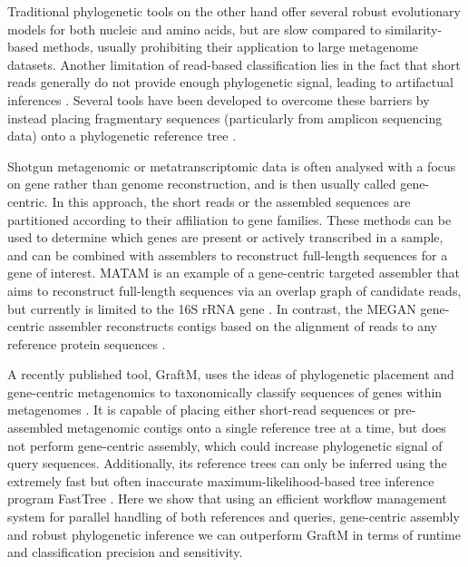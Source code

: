 \documentclass{bioinfo}
\begin{document}
Traditional phylogenetic tools on the other hand offer several robust evolutionary models for both nucleic and amino acids, but are slow compared to similarity-based methods, usually prohibiting their application to large metagenome datasets. Another limitation of read-based classification lies in the fact that short reads generally do not provide enough phylogenetic signal, leading to artifactual inferences \citep{Matsen2010}. Several tools have been developed to overcome these barriers by instead placing fragmentary sequences (particularly from amplicon sequencing data) onto a phylogenetic reference tree \citep{Matsen2010,Berger2011b,Barbera2019}.

Shotgun metagenomic or metatranscriptomic data is often analysed with a focus on gene rather than genome reconstruction, and is then usually called gene-centric. In this approach, the short reads or the assembled sequences are partitioned according to their affiliation to gene families. These methods can be used to determine which genes are present or actively transcribed in a sample, and can be combined with assemblers to reconstruct full-length sequences for a gene of interest. MATAM is an example of a gene-centric targeted assembler that aims to reconstruct full-length sequences via an overlap graph of candidate reads, but currently is limited to the 16S rRNA gene \citep{Pericard2017,Gruber-Vodicka2019}. In contrast, the MEGAN gene-centric assembler reconstructs contigs based on the alignment of reads to any reference protein sequences \citep{Huson2017}.

A recently published tool, GraftM, uses the ideas of phylogenetic placement and gene-centric metagenomics to taxonomically classify sequences of genes within metagenomes \citep{Boyd2018}. It is capable of placing either short-read sequences or pre-assembled metagenomic contigs onto a single reference tree at a time, but does not perform gene-centric assembly, which could increase phylogenetic signal of query sequences. Additionally, its reference trees can only be inferred using the extremely fast but often inaccurate maximum-likelihood-based tree inference program FastTree \citep{Price2010,Zhou2018}. Here we show that using an efficient workflow management system for parallel handling of both references and queries, gene-centric assembly and robust phylogenetic inference we can outperform GraftM in terms of runtime and classification precision and sensitivity. 
\end{document}
